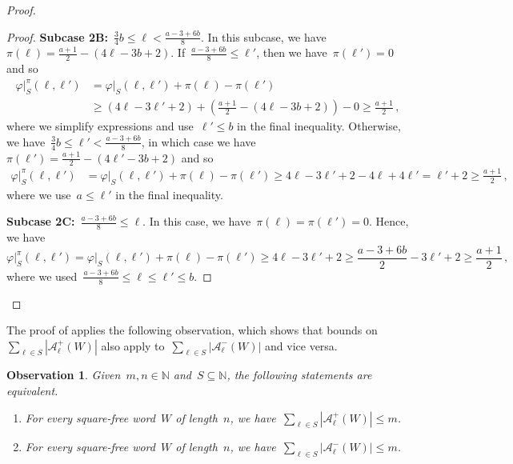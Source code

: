 \documentclass[12pt]{article}
\theoremstyle{plain}
\newtheorem{observation}[theorem]{Observation}
\theoremstyle{definition}
\newcommand{\oldqed}{}
\def\endofClaim{\hfill\scalebox{.6}{$\Box$}}
\newenvironment{claimproof}[1][Proof]{
	\renewcommand{\oldqed}{\qedsymbol}
	\renewcommand{\qedsymbol}{\endofClaim}
	\begin{proof}[#1]
	}{
	\end{proof}
	\renewcommand{\qedsymbol}{\oldqed}
}
\newcommand\N{\mathbb{N}}
\newcommand{\cA}{\mathcal A}
\newcommand{\f}{\varphi}
\newcommand{\w}{\f\vert_S}
\newcommand{\abs}[1]{\mathopen{}\left\lvert#1\right\rvert\mathclose{}}
\begin{document}
\begin{proof}
\begin{claimproof}
			\textbf{Subcase 2B:}~$\frac{3}{4}b\le\ell<\frac{a-3+6b}{8}$. In this subcase, we have~$\pi(\ell)=\frac{a+1}{2}-(4\ell-3b+2)$. If~$\frac{a-3+6b}{8}\le\ell'$, then we have~$\pi(\ell')=0$ and so
			\begin{align*}
				\w^\pi(\ell,\ell') &= \w(\ell,\ell')+\pi(\ell)-\pi(\ell') \\
				&\ge (4\ell-3\ell'+2)+\left(\frac{a+1}{2}-(4\ell-3b+2)\right)-0 \ge\frac{a+1}{2}\,,
			\end{align*}
			where we simplify expressions and use~$\ell'\le b$ in the final inequality. Otherwise, we have~$\frac{3}{4}b\le\ell'<\frac{a-3+6b}{8}$, in which case we have~$\pi(\ell')=\frac{a+1}{2}-(4\ell'-3b+2)$ and so
			\begin{align*} 
				\w^\pi(\ell,\ell')&= \w(\ell,\ell')+\pi(\ell)-\pi(\ell') \ge 4\ell-3\ell'+2-4\ell+4\ell'=\ell'+2 \ge \frac{a+1}{2}\,, 
			\end{align*}
			where we use~$a\le\ell'$ in the final inequality.
			
			\textbf{Subcase 2C:}~$\frac{a-3+6b}{8}\le\ell$. In this case, we have~$\pi(\ell)=\pi(\ell')=0$. Hence, we have
			\[ \w^\pi(\ell,\ell')= \w(\ell,\ell')+\pi(\ell)-\pi(\ell') \ge 4\ell-3\ell'+2 \ge \frac{a-3+6b}{2}-3\ell'+2 \ge \frac{a+1}{2}\,, \]
			where we used~$\frac{a-3+6b}{8}\le\ell\le\ell'\le b$.
		\end{claimproof}
	\end{proof}
	
	The proof of  applies the following observation, which shows that bounds on~$\sum_{\ell\in S}\abs{\cA^{+}_{\ell}(W)}$ also apply to~$\sum_{\ell\in S}\abs{\cA^{-}_{\ell}(W)}$ and vice versa. 
	
	\begin{observation} \label{obs:flip-sign-bounds}
		Given~$m,n\in\N$ and~$S\subseteq\N$, the following statements are equivalent.
		\begin{enumerate}
			\item \label{item:positive-sign-bound} For every square-free word~$W$ of length~$n$, we have~$\sum_{\ell\in S}\abs{\cA^{+}_{\ell}(W)}\le m$.
			\item \label{item:negative-sign-bound} For every square-free word~$W$ of length~$n$, we have~$\sum_{\ell\in S}\abs{\cA^{-}_{\ell}(W)}\le m$.
		\end{enumerate}
	\end{observation}
	
\end{document}
